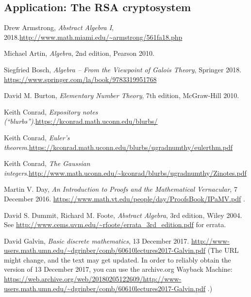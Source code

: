 \documentclass[numbers=enddot,12pt,final,onecolumn,notitlepage]{scrartcl}%
\numberwithin{exer}{subsection}
\theoremstyle{definition}
\begin{document}
\subsection{Application: The RSA cryptosystem}

\begin{thebibliography}{999999999}                                                                                        %


Drew Armstrong, \textit{Abstract Algebra I},
2018.\newline\url{http://www.math.miami.edu/~armstrong/561fa18.php}

Michael Artin, \textit{Algebra}, 2nd edition, Pearson 2010.

Siegfried Bosch, \textit{Algebra -- From the Viewpoint
of Galois Theory}, Springer 2018. \newline\url{https://www.springer.com/la/book/9783319951768}

David M. Burton, \textit{Elementary Number Theory},
7th edition, McGraw-Hill 2010.

Keith Conrad, \textit{Expository notes
(\textquotedblleft blurbs\textquotedblright)}.\newline\url{https://kconrad.math.uconn.edu/blurbs/}

Keith Conrad, \textit{Euler's theorem}.\newline\url{https://kconrad.math.uconn.edu/blurbs/ugradnumthy/eulerthm.pdf}

Keith Conrad, \textit{The Gaussian
integers}.\newline\url{http://www.math.uconn.edu/~kconrad/blurbs/ugradnumthy/Zinotes.pdf}

Martin V. Day, \textit{An Introduction to Proofs and the
Mathematical Vernacular}, 7 December 2016.\newline%
\url{https://www.math.vt.edu/people/day/ProofsBook/IPaMV.pdf} .

David S. Dummit, Richard M. Foote,
\textit{Abstract Algebra}, 3rd edition, Wiley 2004. \newline See
\url{http://www.cems.uvm.edu/~rfoote/errata_3rd_edition.pdf} for errata.

David Galvin, \textit{Basic discrete mathematics},
13 December 2017.\newline%
\url{http://www-users.math.umn.edu/~dgrinber/comb/60610lectures2017-Galvin.pdf}
\newline(The URL might change, and the text may get updated. In order to
reliably obtain the version of 13 December 2017, you can use the archive.org
Wayback Machine:
\url{https://web.archive.org/web/20180205122609/http://www-users.math.umn.edu/~dgrinber/comb/60610lectures2017-Galvin.pdf}
.)


\end{thebibliography}
\end{document}
